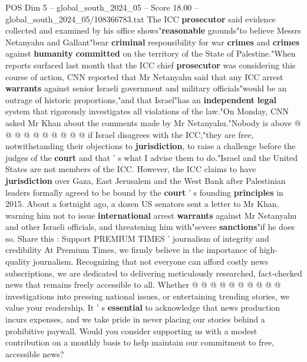 \begin{textsample}{POS Dim 5 – global\_south\_2024\_05 – Score 18.00 – global\_south\_2024\_05/108366783.txt}
The ICC \textbf{prosecutor} said evidence collected and examined by his office shows"\textbf{reasonable} grounds"to believe Messrs Netanyahu and Gallant"bear \textbf{criminal} responsibility for war \textbf{crimes} and \textbf{crimes} against \textbf{humanity} \textbf{committed} on the territory of the State of Palestine."When reports surfaced last month that the ICC chief \textbf{prosecutor} was considering this course of action, CNN reported that Mr Netanyahu said that any ICC arrest \textbf{warrants} against senior Israeli government and military officials"would be an outrage of historic proportions,"and that Israel"has an \textbf{independent} \textbf{legal} system that rigorously investigates all violations of the law."On Monday, CNN asked Mr Khan about the comments made by Mr Netanyahu."Nobody is above @ @ @ @ @ @ @ @ @ @ if Israel disagrees with the ICC,"they are free, notwithstanding their objections to \textbf{jurisdiction}, to raise a challenge before the judges of the \textbf{court} and that ' s what I advise them to do."Israel and the United States are not members of the ICC.
However, the ICC claims to have \textbf{jurisdiction} over Gaza, East Jerusalem and the West Bank after Palestinian leaders formally agreed to be bound by the \textbf{court} ' s founding \textbf{principles} in 2015.
About a fortnight ago, a dozen US senators sent a letter to Mr Khan, warning him not to issue \textbf{international} arrest \textbf{warrants} against Mr Netanyahu and other Israeli officials, and threatening him with"severe \textbf{sanctions}"if he does so.
Share this : Support PREMIUM TIMES ' journalism of integrity and credibility At Premium Times, we firmly believe in the importance of high-quality journalism.
Recognizing that not everyone can afford costly news subscriptions, we are dedicated to delivering meticulously researched, fact-checked news that remains freely accessible to all.
Whether @ @ @ @ @ @ @ @ @ @ investigations into pressing national issues, or entertaining trending stories, we value your readership.
It ' s \textbf{essential} to acknowledge that news production incurs expenses, and we take pride in never placing our stories behind a prohibitive paywall.
Would you consider supporting us with a modest contribution on a monthly basis to help maintain our commitment to free, accessible news?

\end{textsample}
